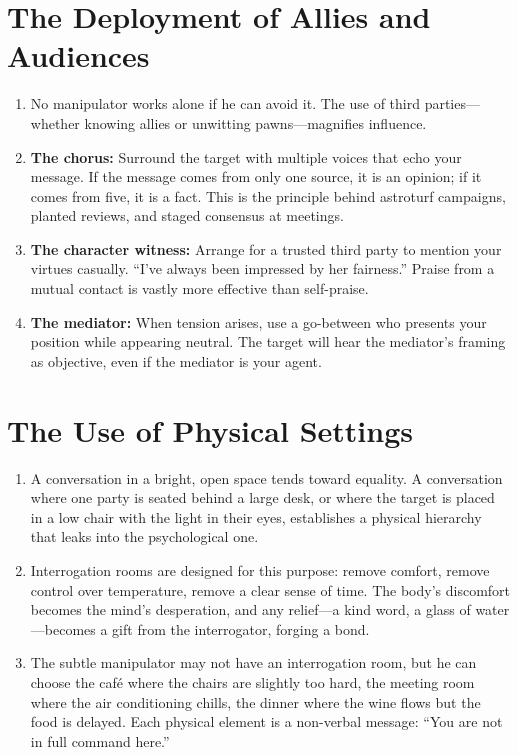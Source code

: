 \documentclass[12pt,a4paper,oneside]{book}
\begin{document}
\section{The Deployment of Allies and Audiences}
\begin{enumerate}[leftmargin=*, label=\arabic*.]
\item No manipulator works alone if he can avoid it. The use of third parties—whether knowing allies or unwitting pawns—magnifies influence.
\item \textbf{The chorus:} Surround the target with multiple voices that echo your message. If the message comes from only one source, it is an opinion; if it comes from five, it is a fact. This is the principle behind astroturf campaigns, planted reviews, and staged consensus at meetings.
\item \textbf{The character witness:} Arrange for a trusted third party to mention your virtues casually. “I've always been impressed by her fairness.” Praise from a mutual contact is vastly more effective than self-praise.
\item \textbf{The mediator:} When tension arises, use a go-between who presents your position while appearing neutral. The target will hear the mediator's framing as objective, even if the mediator is your agent.
\end{enumerate}

\section{The Use of Physical Settings}
\begin{enumerate}[leftmargin=*, label=\arabic*.]
\item A conversation in a bright, open space tends toward equality. A conversation where one party is seated behind a large desk, or where the target is placed in a low chair with the light in their eyes, establishes a physical hierarchy that leaks into the psychological one.
\item Interrogation rooms are designed for this purpose: remove comfort, remove control over temperature, remove a clear sense of time. The body's discomfort becomes the mind's desperation, and any relief—a kind word, a glass of water—becomes a gift from the interrogator, forging a bond.
\item The subtle manipulator may not have an interrogation room, but he can choose the café where the chairs are slightly too hard, the meeting room where the air conditioning chills, the dinner where the wine flows but the food is delayed. Each physical element is a non-verbal message: “You are not in full command here.”
\end{enumerate}
\end{document}
